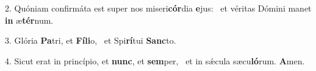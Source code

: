 2. Quóniam confirmáta est super nos miseri\textbf{cór}dia \textbf{e}jus: \ast\  et véritas Dómini manet \textbf{in} æ\textbf{tér}num.\

3. Glória \textbf{Pa}tri, et \textbf{Fí}\textbf{li}o, \ast\  et Spi\textbf{rí}tui \textbf{Sanc}to.\

4. Sicut erat in princípio, et \textbf{nunc}, et \textbf{sem}per, \ast\  et in sǽcula sæcu\textbf{ló}rum. \textbf{A}men.\


